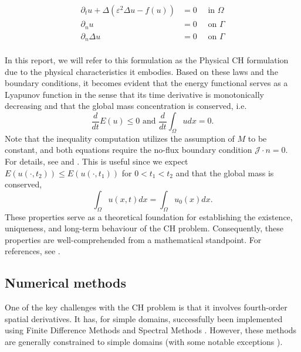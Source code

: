 \documentclass[11pt]{article}
\theoremstyle{remark}
\renewcommand{\le}{\leqslant}
\numberwithin{equation}{section}
\begin{document}
\begin{equation}
\label{eq:strongch}
    \begin{split}
\partial _{t} u + \Delta  \left(  \varepsilon^2  \Delta u - f( u) \right)   &=0  \quad \text{ in } \Omega  \\
\partial _{n} u &= 0 \quad \text{ on } \Gamma  \\
\partial _{n}    \Delta u       &= 0 \quad \text{ on } \Gamma  \\
    \end{split}
\end{equation}

In this report, we will refer to this formulation as the Physical CH formulation due to the physical characteristics it embodies.
Based on these laws and the boundary conditions, it becomes evident that the energy functional serves as a Lyapunov function in the sense that its time derivative is monotonically decreasing and that the global mass concentration is conserved, i.e.
\begin{equation}
\label{eq:mass_cons_energy_decrease}
\frac{d}{dt} E( u) \le   0 \text{ and }\frac{d}{dt} \int_{\Omega }^{}  u dx = 0.
\end{equation}
Note that the inequality computation utilizes the assumption of $M$ to be constant, and both equations require the no-flux boundary condition $\mathcal{J} \cdot n = 0$.
For details, see \cite[Equation 17]{lee2014physical} and \cite[Equation 1.7]{garcke2020weak}.
This is useful since we expect $E( u( \cdot , t_{2}) ) \le  E( u( \cdot , t_{1}) ) $ for $0 < t_{1} < t_{2} $ and that the global mass is conserved,
\begin{equation}
    \int_{\Omega }^{} u ( x,t)  dx = \int_{\Omega }^{} u_{0}(x)  dx.
\end{equation}
These properties serve as a theoretical foundation for establishing the existence, uniqueness, and long-term behaviour of the CH problem. Consequently, these properties are well-comprehended from a mathematical standpoint. For
references, see \cite{abels2007convergence, cherfils2011cahn, elliott1986cahn}.

\subsection{Numerical methods}%
\label{sub:numerical_methods}

One of the key challenges with the CH problem is that it involves fourth-order spatial derivatives. It has, for simple domains, successfully been implemented using Finite Difference Methods \cite{furihata2001stable,
cheng2019energy} and Spectral Methods \cite{liu2003phase, he2009class}. However, these methods are generally constrained to simple domains (with some notable exceptions \cite{li2013conservative, shen2009efficient, feng2009fourier}).
\end{document}

